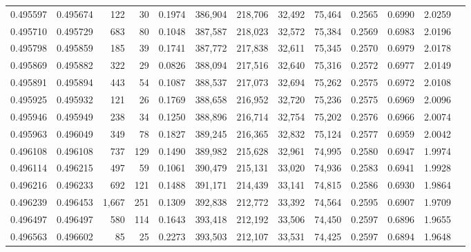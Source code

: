 \begin{tabular}{rrrrrrrrrrrrr}
0.495597 & 0.495674 &   122 &    30 &                                     0.1974 & 386,904 & 218,706 &  32,492 &  75,464 & 0.2565 & 0.6990 & 2.0259 \\
0.495710 & 0.495729 &   683 &    80 &                                     0.1048 & 387,587 & 218,023 &  32,572 &  75,384 & 0.2569 & 0.6983 & 2.0196 \\
0.495798 & 0.495859 &   185 &    39 &                                     0.1741 & 387,772 & 217,838 &  32,611 &  75,345 & 0.2570 & 0.6979 & 2.0178 \\
0.495869 & 0.495882 &   322 &    29 &                                     0.0826 & 388,094 & 217,516 &  32,640 &  75,316 & 0.2572 & 0.6977 & 2.0149 \\
0.495891 & 0.495894 &   443 &    54 &                                     0.1087 & 388,537 & 217,073 &  32,694 &  75,262 & 0.2575 & 0.6972 & 2.0108 \\
0.495925 & 0.495932 &   121 &    26 &                                     0.1769 & 388,658 & 216,952 &  32,720 &  75,236 & 0.2575 & 0.6969 & 2.0096 \\
0.495946 & 0.495949 &   238 &    34 &                                     0.1250 & 388,896 & 216,714 &  32,754 &  75,202 & 0.2576 & 0.6966 & 2.0074 \\
0.495963 & 0.496049 &   349 &    78 &                                     0.1827 & 389,245 & 216,365 &  32,832 &  75,124 & 0.2577 & 0.6959 & 2.0042 \\
0.496108 & 0.496108 &   737 &   129 &                                     0.1490 & 389,982 & 215,628 &  32,961 &  74,995 & 0.2580 & 0.6947 & 1.9974 \\
0.496114 & 0.496215 &   497 &    59 &                                     0.1061 & 390,479 & 215,131 &  33,020 &  74,936 & 0.2583 & 0.6941 & 1.9928 \\
0.496216 & 0.496233 &   692 &   121 &                                     0.1488 & 391,171 & 214,439 &  33,141 &  74,815 & 0.2586 & 0.6930 & 1.9864 \\
0.496239 & 0.496453 & 1,667 &   251 &                                     0.1309 & 392,838 & 212,772 &  33,392 &  74,564 & 0.2595 & 0.6907 & 1.9709 \\
0.496497 & 0.496497 &   580 &   114 &                                     0.1643 & 393,418 & 212,192 &  33,506 &  74,450 & 0.2597 & 0.6896 & 1.9655 \\
0.496563 & 0.496602 &    85 &    25 &                                     0.2273 & 393,503 & 212,107 &  33,531 &  74,425 & 0.2597 & 0.6894 & 1.9648 \\

\end{tabular}
